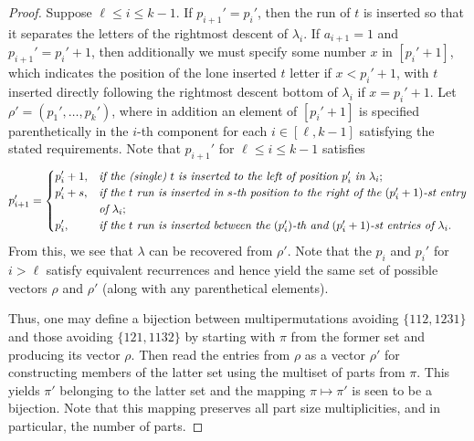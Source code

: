 \documentclass[11pt]{amsart}
\theoremstyle{plain}
\theoremstyle{definition}
\begin{document}
\begin{proof}
Suppose $\ell \leq i \leq k-1$.  If $p_{i+1}'=p_{i}'$, then the run of $t$ is inserted so that it
separates the letters of the rightmost descent of $\lambda_{i}$.  If $a_{i+1}=1$ and
$p_{i+1}'=p_{i}'+1$, then additionally we must specify some number $x$ in $[p_{i}'+1]$, which
indicates the position of the lone inserted $t$ letter if $x<p_{i}'+1$, with $t$ inserted directly
following the rightmost descent bottom of $\lambda_{i}$ if $x=p_{i}'+1$.  Let
$\rho'=(p_1',\ldots,p_k')$, where in addition an element of $[p_{i}'+1]$ is specified
parenthetically in the $i$-th component for each $i \in [\ell,k-1]$ satisfying the stated
requirements.  Note that $p_{i+1}'$ for $\ell\leq i \leq k-1$ satisfies
$$p_{i+1}'=\begin{cases}
{\displaystyle p_{i}'+1}, &\emph{if~the~(single)}~t~\emph{is~inserted to the left of position}~p_{i}'~\emph{in}~\lambda_{i};\\
{\displaystyle p_{i}'+s}, &\emph{if~the}~t~\emph{run~is~inserted~in}~s\emph{-th}~\emph{position~to~the~right~of~the}~(p_{i}'+1)\emph{-st~entry}\\
{\displaystyle ~} &\emph{of}~\lambda_{i};\\
{\displaystyle p_{i}'},  &\emph{if~the}~t~\emph{run~is~inserted~between~the}~(p_{i}')\emph{-th~and}~ (p_{i}'+1)\emph{-st~entries~of}~\lambda_{i}.
\end{cases}$$
From this, we see that $\lambda$ can be recovered from $\rho'$.  Note that the $p_i$ and $p_i'$ for
$i>\ell$ satisfy equivalent recurrences and hence yield the same set of possible vectors $\rho$ and
$\rho'$ (along with any parenthetical elements).

Thus, one may define a bijection between multipermutations avoiding $\{112,1231\}$ and those
avoiding $\{121,1132\}$ by starting with $\pi$ from the former set and producing its vector $\rho$.
Then read the entries from $\rho$ as a vector $\rho'$ for constructing members of the latter set
using the multiset of parts from $\pi$.  This yields $\pi'$ belonging to the latter set and the
mapping $\pi \mapsto \pi'$ is seen to be a bijection.  Note that this mapping preserves all part size
multiplicities, and in particular, the number of parts.
\end{proof}
\end{document}
